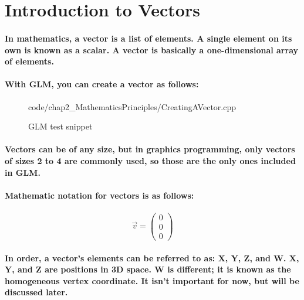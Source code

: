 \section{Introduction to Vectors}
\paragraph{
    In mathematics, a vector is a list of elements. A single element on its own is known as a scalar. A vector is basically a one-dimensional array of elements.
}

\paragraph{
    With GLM, you can create a vector as follows:
}

\begin{frame}{}
    \begin{figure}[ht]
    \centering
    \colorbox{backgroundcolor}{
        \parbox{0.9\textwidth}{
            
            {code/chap2_MathematicsPrinciples/CreatingAVector.cpp}
        }
    }
    \caption{GLM test snippet}
    \label{fig:creatingAVector}
    \end{figure}
\end{frame}

\paragraph{
    Vectors can be of any size, but in graphics programming, only vectors of sizes 2 to 4 are commonly used, so those are the only ones included in GLM.
}

\paragraph{
    Mathematic notation for vectors is as follows:
}

\paragraph{
    \begin{equation*}
    \vec{v} =\begin{pmatrix}
    0\\
    0\\
    0
    \end{pmatrix}
    \end{equation*}
}

\paragraph{
    In order, a vector's elements can be referred to as: X, Y, Z, and W. X, Y, and Z are positions in 3D space. W is different; it is known as the \textbf{homogeneous vertex coordinate}. It isn't important for now, but will be discussed later.
}

